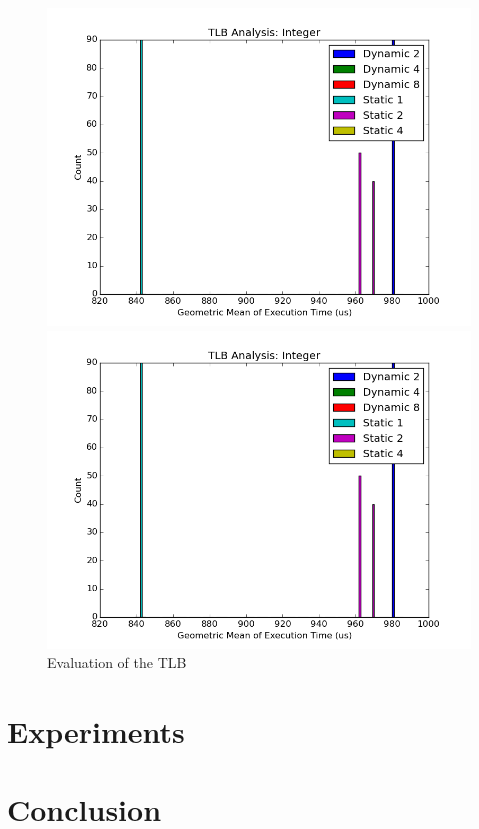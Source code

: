 \documentclass[paper=a4, fontsize=12pt]{scrartcl} %
\numberwithin{equation}{section} %
\numberwithin{figure}{section} %
\numberwithin{table}{section} %
\begin{document}
\begin{figure}
\centering
\begin{minipage}{0.5\textwidth}
\centering
	\includegraphics[width=\linewidth]{graphs/TLB/TLB_Analysis_Integer.png}
\end{minipage}\hfill
\begin{minipage}{0.5\textwidth}
\centering
 \includegraphics[width=\linewidth]{graphs/TLB/TLB_Analysis_Integer.png}
\end{minipage}

\caption{Evaluation of the TLB}
\label{fig:tlb}
\end{figure}


\section{Experiments}



\section{Conclusion}
\end{document}
